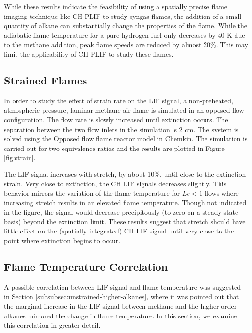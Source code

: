 While these results indicate the feasibility of using a spatially precise flame imaging technique like CH PLIF to study syngas flames, the addition of a small quantity of alkane can substantially change the properties of the flame.
While the adiabatic flame temperature for a pure hydrogen fuel only decreases by 40 K due to the methane addition, peak flame speeds are reduced by almost 20\%.
This may limit the applicability of CH PLIF to study these flames.

\subsection{Strained Flames}

In order to study the effect of strain rate on the LIF signal, a non-preheated, atmospheric pressure, laminar methane-air flame is simulated in an opposed flow configuration.
The flow rate is slowly increased until extinction occurs.
The separation between the two flow inlets in the simulation is 2 cm.
The system is solved using the Opposed flow flame reactor model in Chemkin.
The simulation is carried out for two equivalence ratios and the results are plotted in Figure \ref{fig:strain}.




The LIF signal increases with stretch, by about 10\%, until close to the extinction strain.
Very close to extinction, the CH LIF signals decreases slightly.
This behavior mirrors the variation of the flame temperature for \(Le<1\) flows where increasing stretch results in an elevated flame temperature.
Though not indicated in the figure, the signal would decrease precipitously (to zero on a steady-state basis) beyond the extinction limit.
These results suggest that stretch should have little effect on the (spatially integrated) CH LIF signal until very close to the point where extinction begins to occur.


\subsection{Flame Temperature Correlation}

A possible correlation between LIF signal and flame temperature was suggested in Section \ref{subsubsec:unstrained-higher-alkanes}, where it was pointed out that the marginal increase in the LIF signal between methane and the higher order alkanes mirrored the change in flame temperature.
In this section, we examine this correlation in greater detail.

